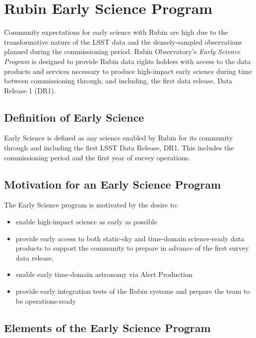 \section{Rubin Early Science Program}

Community expectations for early science with Rubin are high due to the transformative nature of the LSST data and the densely-sampled observations planned during the commissioning period.
Rubin Observatory's \emph{Early Science Program} is designed to provide Rubin data rights holders with access to the data products and services necessary to produce high-impact early science during time between commissioning through, and including, the first data release, Data Release 1 (DR1). 

\subsection{Definition of Early Science}  \label{ssec:defn}
Early Science is defined as any science enabled by Rubin for its community through and including the first LSST Data Release, DR1.
 This includes the commissioning period and the first year of survey operations.

\subsection{Motivation for an Early Science Program}  \label{ssec:motivation}

The Early Science program is motivated by the desire to:
\begin{itemize}
\item enable high-impact science as early as possible
\item provide early access to both static-sky and time-domain science-ready data products to support the community to prepare in advance of the first survey data release, 
\item enable early time-domain astronomy via Alert Production
\item provide early integration tests of the Rubin systems and prepare the team to be operations-ready
\end{itemize}


\subsection{Elements of the Early Science Program}

